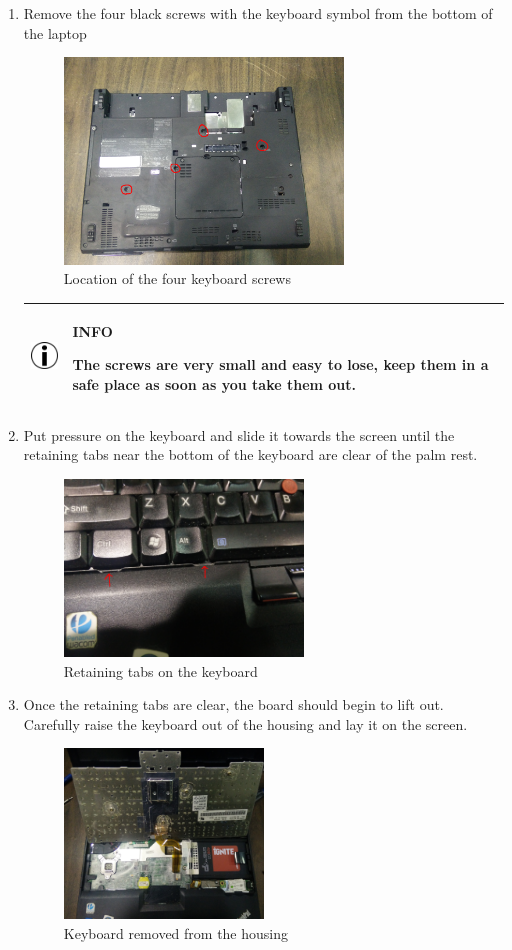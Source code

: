 \documentclass{article}
\newcommand{\alertinfobox}[2]{
	\begin{center}
		\begin{tabularx}{0.9\linewidth}{| c X |}
			\hline
			\raisebox{\dimexpr2\baselineskip-\height}
			{\includegraphics[width=0.5in]{info.jpg}}&
			\raisebox{\tabcolsep}{\strut}\par\textbf{#1}\par#2\raisebox{-\tabcolsep}{\strut} \\ \hline
		\end{tabularx}
	\end{center}
}
\begin{document}
\begin{enumerate}
	\clearpage
	\item Remove the four black screws with the keyboard symbol from the bottom of the laptop
	\begin{figure}[H]
		\centering
		\includegraphics[width=0.7\textwidth]{keyboardscrews.jpg}
		\caption{Location of the four keyboard screws}
		\label{fig:screws}
	\end{figure}

	\alertinfobox{INFO}{
		The screws are very small and easy to lose, keep them in a safe place as soon as you take them out.
	}

	\item Put pressure on the keyboard and slide it towards the screen until the retaining tabs near the bottom of the keyboard are clear of the palm rest.
	\begin{figure}[H]
		\centering
		\includegraphics[width=0.6\textwidth]{keyboardslide.jpg}
		\caption{Retaining tabs on the keyboard}
	\end{figure}

	\item Once the retaining tabs are clear, the board should begin to lift out.
	Carefully raise the keyboard out of the housing and lay it  on the screen.
	\begin{figure}[H]
		\centering
		\includegraphics[width=0.5\textwidth]{keyboardonscreen.jpg}
		\caption{Keyboard removed from the housing}
	\end{figure}


\end{enumerate}
\end{document}
